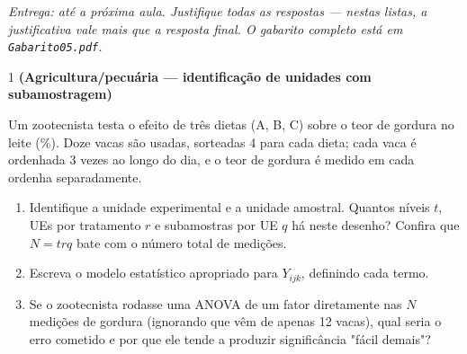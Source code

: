 \documentclass[11pt]{article}
\begin{document}

\noindent \textit{Entrega: até a próxima aula. Justifique todas as respostas --- nestas listas, a
justificativa vale mais que a resposta final. O gabarito completo está em \texttt{Gabarito05.pdf}.}

\begin{questao}{1} \textbf{(Agricultura/pecuária --- identificação de unidades com subamostragem)}

Um zootecnista testa o efeito de três dietas (A, B, C) sobre o teor de gordura no leite (\%).
Doze vacas são usadas, sorteadas 4 para cada dieta; cada vaca é ordenhada 3 vezes ao longo do
dia, e o teor de gordura é medido em cada ordenha separadamente.

\begin{enumerate}[label=(\alph*)]
  \item Identifique a unidade experimental e a unidade amostral. Quantos níveis $t$, UEs por
    tratamento $r$ e subamostras por UE $q$ há neste desenho? Confira que $N = trq$ bate com o
    número total de medições.
  \item Escreva o modelo estatístico apropriado para $Y_{ijk}$, definindo cada termo.
  \item Se o zootecnista rodasse uma ANOVA de um fator diretamente nas $N$ medições de gordura
    (ignorando que vêm de apenas 12 vacas), qual seria o erro cometido e por que ele tende a
    produzir significância "fácil demais"?
\end{enumerate}
\end{questao}
\end{document}
